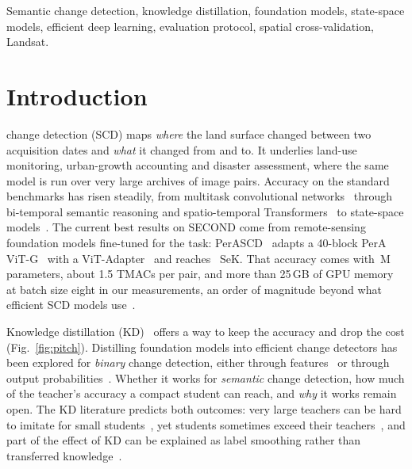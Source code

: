 \documentclass[journal]{IEEEtran}
\begin{document}
\begin{IEEEkeywords}
Semantic change detection, knowledge distillation, foundation models, state-space models,
efficient deep learning, evaluation protocol, spatial cross-validation, Landsat.
\end{IEEEkeywords}

\section{Introduction}
\label{sec:intro}

 change detection (SCD) maps \emph{where} the land surface changed
between two acquisition dates and \emph{what} it changed from and to. It underlies
land-use monitoring, urban-growth accounting and disaster assessment, where the same model is
run over very large archives of image pairs. Accuracy on the standard benchmarks has risen
steadily, from multitask convolutional networks~\cite{daudt2019multitask,yang2022asymmetric}
through bi-temporal semantic reasoning and spatio-temporal Transformers~\cite{ding2022bi,
ding2024joint} to state-space models~\cite{chen2024changemamba,wijenayake2026mamba}. The
current best results on SECOND come from remote-sensing foundation models fine-tuned for the
task: PerASCD~\cite{shen2026foundation} adapts a 40-block PerA ViT-G~\cite{shen2026contrastive}
with a ViT-Adapter~\cite{chen2023vision} and reaches \TeacherVitgSek\ SeK. That accuracy comes
with \TeacherParams\,M parameters, about 1.5 TMACs per pair, and more than 25\,GB of
GPU memory at batch size eight in our measurements, an order of magnitude beyond what
efficient SCD models use~\cite{chen2024changemamba}.

Knowledge distillation (KD)~\cite{hinton2015distilling} offers a way to keep the accuracy and
drop the cost (Fig.~\ref{fig:pitch}). Distilling foundation models into efficient change detectors has been explored
for \emph{binary} change detection, either through features~\cite{wang2025burden} or through
output probabilities~\cite{wang2024knowledge}. Whether it works for \emph{semantic} change
detection, how much of the teacher's accuracy a compact student can reach, and \emph{why} it
works remain open. The KD literature predicts both outcomes: very large teachers can be hard
to imitate for small students~\cite{cho2019efficacy,mirzadeh2020improved}, yet students
sometimes exceed their teachers~\cite{furlanello2018born,yuan2020revisiting,
stanton2021knowledge}, and part of the effect of KD can be explained as label smoothing
rather than transferred knowledge~\cite{yuan2020revisiting,muller2019label}.
\end{document}
